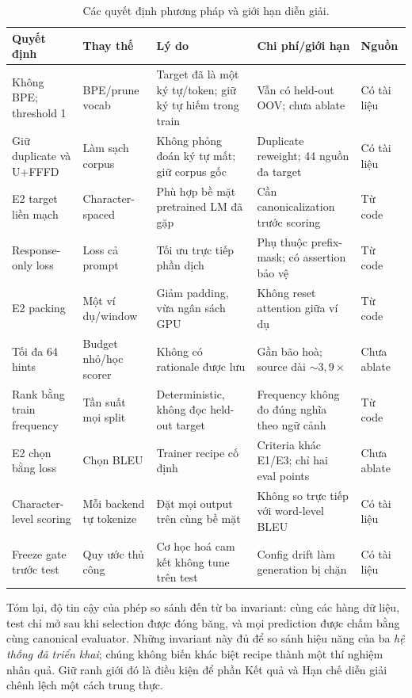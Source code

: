 \begin{table}[tbp]
  \centering
  \scriptsize
  \renewcommand{\arraystretch}{1.18}
  \setlength{\tabcolsep}{3pt}
  \caption{Các quyết định phương pháp và giới hạn diễn giải.}
  \label{tab:decisions}
  \begin{tabularx}{\textwidth}{@{}p{2.35cm}p{2.05cm}XXp{1.7cm}@{}}
    \toprule
    \textbf{Quyết định} & \textbf{Thay thế} & \textbf{Lý do}
      & \textbf{Chi phí/giới hạn} & \textbf{Nguồn} \\
    \midrule
    Không BPE; threshold 1
      & BPE/prune vocab
      & Target đã là một ký tự/token; giữ ký tự hiếm trong train
      & Vẫn có held-out OOV; chưa ablate
      & Có tài liệu \\
    Giữ duplicate và U+FFFD
      & Làm sạch corpus
      & Không phỏng đoán ký tự mất; giữ corpus gốc
      & Duplicate reweight; 44 nguồn đa target
      & Có tài liệu \\
    E2 target liền mạch
      & Character-spaced
      & Phù hợp bề mặt pretrained LM đã gặp
      & Cần canonicalization trước scoring
      & Từ code \\
    Response-only loss
      & Loss cả prompt
      & Tối ưu trực tiếp phần dịch
      & Phụ thuộc prefix-mask; có assertion bảo vệ
      & Từ code \\
    E2 packing
      & Một ví dụ/window
      & Giảm padding, vừa ngân sách GPU
      & Không reset attention giữa ví dụ
      & Từ code \\
    Tối đa 64 hints
      & Budget nhỏ/học scorer
      & Không có rationale được lưu
      & Gần bão hoà; source dài $\sim3{,}9\times$
      & Chưa ablate \\
    Rank bằng train frequency
      & Tần suất mọi split
      & Deterministic, không đọc held-out target
      & Frequency không đo đúng nghĩa theo ngữ cảnh
      & Từ code \\
    E2 chọn bằng loss
      & Chọn BLEU
      & Trainer recipe cố định
      & Criteria khác E1/E3; chỉ hai eval points
      & Chưa ablate \\
    Character-level scoring
      & Mỗi backend tự tokenize
      & Đặt mọi output trên cùng bề mặt
      & Không so trực tiếp với word-level BLEU
      & Có tài liệu \\
    Freeze gate trước test
      & Quy ước thủ công
      & Cơ học hoá cam kết không tune trên test
      & Config drift làm generation bị chặn
      & Có tài liệu \\
    \bottomrule
  \end{tabularx}
\end{table}

Tóm lại, độ tin cậy của phép so sánh đến từ ba invariant: cùng các hàng dữ
liệu, test chỉ mở sau khi selection được đóng băng, và mọi prediction được
chấm bằng cùng canonical evaluator. Những invariant này đủ để so sánh hiệu
năng của ba \emph{hệ thống đã triển khai}; chúng không biến khác biệt recipe
thành một thí nghiệm nhân quả. Giữ ranh giới đó là điều kiện để phần Kết quả
và Hạn chế diễn giải chênh lệch một cách trung thực.
